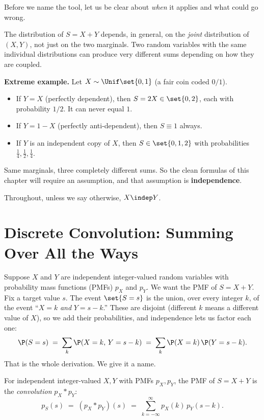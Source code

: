 Before we name the tool, let us be clear about \emph{when} it applies and
what could go wrong.

\begin{focusbox}
The distribution of $S = X+Y$ depends, in general, on the \emph{joint}
distribution of $(X,Y)$, not just on the two marginals. Two random
variables with the same individual distributions can produce very
different sums depending on how they are coupled.

\textbf{Extreme example.} Let $X \sim \Unif\set{0,1}$ (a fair coin coded
$0/1$).
\begin{itemize}
  \item If $Y = X$ (perfectly dependent), then $S = 2X \in \set{0,2}$,
        each with probability $1/2$. It can never equal $1$.
  \item If $Y = 1-X$ (perfectly anti-dependent), then $S \equiv 1$ always.
  \item If $Y$ is an independent copy of $X$, then
        $S \in \set{0,1,2}$ with probabilities $\tfrac14,\tfrac12,\tfrac14$.
\end{itemize}
Same marginals, three completely different sums. So the clean formulas of
this chapter will require an assumption, and that assumption is
\textbf{independence}.
\end{focusbox}

Throughout, unless we say otherwise, $X \indep Y$.

\section{Discrete Convolution: Summing Over All the Ways}
\label{ch17:discrete-conv}

Suppose $X$ and $Y$ are independent integer-valued random variables with
probability mass functions (PMFs) $p_X$ and $p_Y$. We want the PMF of
$S = X+Y$. Fix a target value $s$. The event $\set{S=s}$ is the union,
over every integer $k$, of the event ``$X=k$ \emph{and} $Y=s-k$.'' These
are disjoint (different $k$ means a different value of $X$), so we add
their probabilities, and independence lets us factor each one:
\[
\P(S=s) \;=\; \sum_{k} \P(X=k,\,Y=s-k)
            \;=\; \sum_{k} \P(X=k)\,\P(Y=s-k).
\]
That is the whole derivation. We give it a name.

\begin{definition}
\label{ch17:def-discrete-conv}
For independent integer-valued $X,Y$ with PMFs $p_X,p_Y$, the PMF of
$S=X+Y$ is the \emph{convolution} $p_X * p_Y$:
\[
p_S(s) \;=\; (p_X * p_Y)(s) \;=\; \sum_{k=-\infty}^{\infty} p_X(k)\,p_Y(s-k).
\]
\end{definition}

